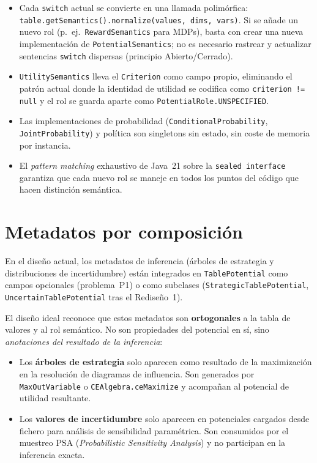 \documentclass[11pt,a4paper]{article}
\newcommand{\code}[1]{\texttt{#1}}
\begin{document}
\begin{itemize}
  \item Cada \code{switch} actual se convierte en una llamada polimórfica:
        \code{table.getSemantics().normalize(values, dims, vars)}.  Si se
        añade un nuevo rol (p.~ej.\ \code{RewardSemantics} para MDPs), basta
        con crear una nueva implementación de \code{PotentialSemantics};
        no es necesario rastrear y actualizar sentencias \code{switch}
        dispersas (principio Abierto/Cerrado).

  \item \code{UtilitySemantics} lleva el \code{Criterion} como campo
        propio, eliminando el patrón actual donde la identidad de utilidad
        se codifica como \code{criterion != null} y el rol se guarda
        aparte como \code{PotentialRole.UNSPECIFIED}.

  \item Las implementaciones de probabilidad (\code{ConditionalProbability},
        \code{JointProbability}) y política son singletons sin estado,
        sin coste de memoria por instancia.

  \item El \emph{pattern matching} exhaustivo de Java~21 sobre la
        \code{sealed interface} garantiza que cada nuevo rol se maneje
        en todos los puntos del código que hacen distinción semántica.
\end{itemize}

\section{Metadatos por composición}
\label{sec:ideal-metadatos}

En el diseño actual, los metadatos de inferencia (árboles de estrategia y
distribuciones de incertidumbre) están integrados en \code{TablePotential}
como campos opcionales (problema~P1) o como subclases
(\code{StrategicTablePotential}, \code{UncertainTablePotential} tras el
Rediseño~1).

El diseño ideal reconoce que estos metadatos son \textbf{ortogonales} a la
tabla de valores y al rol semántico.  No son propiedades del potencial en
sí, sino \emph{anotaciones del resultado de la inferencia}:

\begin{itemize}
  \item Los \textbf{árboles de estrategia} solo aparecen como resultado de
        la maximización en la resolución de diagramas de influencia.
        Son generados por \code{MaxOutVariable} o \code{CEAlgebra.ceMaximize}
        y acompañan al potencial de utilidad resultante.

  \item Los \textbf{valores de incertidumbre} solo aparecen en potenciales
        cargados desde fichero para análisis de sensibilidad paramétrica.
        Son consumidos por el muestreo PSA (\emph{Probabilistic Sensitivity
        Analysis}) y no participan en la inferencia exacta.
\end{itemize}
\end{document}
